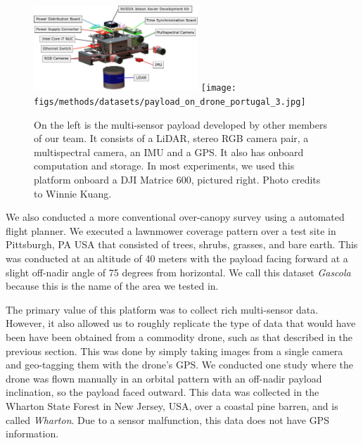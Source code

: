 \begin{figure}
    \centering
    \includegraphics[width=0.55\textwidth]{figs/methods/datasets/payload_annotated.pdf}
    \hfill
    \texttt{[image: figs/methods/datasets/payload\_on\_drone\_portugal\_3.jpg]}
    \caption{On the left is the multi-sensor payload developed by other members of our team. It consists of a LiDAR, stereo RGB camera pair, a multispectral camera, an IMU and a GPS. It also has onboard computation and storage. In most experiments, we used this platform onboard a DJI Matrice 600, pictured right. Photo credits to Winnie Kuang.}
    \label{fig:methods:payload}
\end{figure}


We also conducted a more conventional over-canopy survey using a automated flight planner. We executed a lawnmower coverage pattern over a test site in Pittsburgh, PA USA that consisted of trees, shrubs, grasses, and bare earth. This was conducted at an altitude of 40 meters with the payload facing forward at a slight off-nadir angle of 75 degrees from horizontal. We call this dataset \textit{Gascola} because this is the name of the area we tested in.

The primary value of this platform was to collect rich multi-sensor data. However, it also allowed us to roughly replicate the type of data that would have been have been obtained from a commodity drone, such as that described in the previous section. This was done by simply taking images from a single camera and geo-tagging them with the drone's GPS. We conducted one study where the drone was flown manually in an orbital pattern with an off-nadir payload inclination, so the payload faced outward. This data was collected in the Wharton State Forest in New Jersey, USA, over a coastal pine barren, and is called \textit{Wharton}. Due to a sensor malfunction, this data does not have GPS information.



